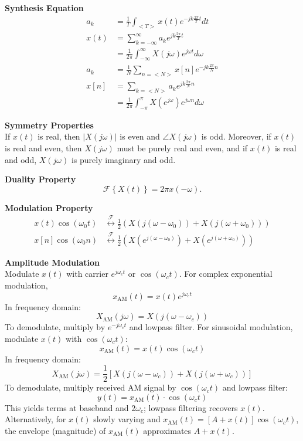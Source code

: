 \documentclass{article}
\begin{document}
\begin{multicols}{2}
    \noindent\textbf{Synthesis Equation}
    \begin{align*}
        a_k  & = \frac{1}{T} \int_{<T>} x(t) e^{-jk\frac{2\pi}{T} t} dt                  \\
        x(t) & = \sum_{k=-\infty}^{\infty} a_k e^{jk\frac{2\pi}{T} t}                    \\
             & = \frac{1}{2\pi} \int_{-\infty}^{\infty} X(j\omega) e^{j\omega t} d\omega \\
        a_k  & = \frac{1}{N} \sum_{n=<N>} x[n] e^{-jk\frac{2\pi}{N}n}                    \\
        x[n] & = \sum_{k=<N>} a_k e^{jk\frac{2\pi}{N} n}                                 \\
             & = \frac{1}{2\pi} \int_{-\pi}^{\pi} X(e^{j\omega}) e^{j\omega n} d\omega
    \end{align*}

    \noindent\textbf{Symmetry Properties} \\
    If $x(t)$ is real, then $|X(j\omega)|$ is even and
    $\angle X(j\omega)$ is odd. Moreover, if $x(t)$ is real
    and even, then $X(j\omega)$ must be purely real and even,
    and if $x(t)$ is real and odd, $X(j\omega)$ is purely
    imaginary and odd.

    \noindent\textbf{Duality Property}
    \[ \label{eq:duality}
        \mathcal{F}\left\{ X(t) \right\} = 2\pi x(-\omega).
    \]

    \noindent\textbf{Modulation Property} \\
    \begin{align*}
        x(t)\cos(\omega_0 t) & \overset{\mathcal{F}}{\leftrightarrow} \frac{1}{2}\left( X(j(\omega-\omega_0)) + X(j(\omega+\omega_0))\right)          \\
        x[n]\cos(\omega_0 n) & \overset{\mathcal{F}}{\leftrightarrow}  \frac{1}{2}\left( X(e^{j(\omega-\omega_0)}) + X(e^{j(\omega+\omega_0)})\right)
    \end{align*}

    \noindent\textbf{Amplitude Modulation}\\
    Modulate $x(t)$ with carrier $e^{j\omega_c t}$ or $\cos(\omega_c t)$.
    For complex exponential modulation,
    \[
        x_{\text{AM}}(t) = x(t) e^{j\omega_c t}
    \]
    In frequency domain:
    \[
        X_{\text{AM}}(j\omega) = X(j(\omega - \omega_c))
    \]
    To demodulate, multiply by $e^{-j\omega_c t}$ and lowpass filter.
    For sinusoidal modulation, modulate $x(t)$ with $\cos(\omega_c t)$:
    \[
        x_{\text{AM}}(t) = x(t) \cos(\omega_c t)
    \]
    In frequency domain:
    \[
        X_{\text{AM}}(j\omega) = \frac{1}{2}\left[X(j(\omega-\omega_c)) + X(j(\omega+\omega_c))\right]
    \]
    To demodulate, multiply received AM signal by $\cos(\omega_c t)$ and lowpass filter:
    \[
        y(t) = x_{\text{AM}}(t) \cdot \cos(\omega_c t)
    \]
    This yields terms at baseband and $2\omega_c$; lowpass filtering recovers $x(t)$.
    Alternatively, for $x(t)$ slowly varying and $x_{\text{AM}}(t) = [A + x(t)]\cos(\omega_c t)$,
    the envelope (magnitude) of $x_{\text{AM}}(t)$ approximates $A + x(t)$.


\end{multicols}
\end{document}
